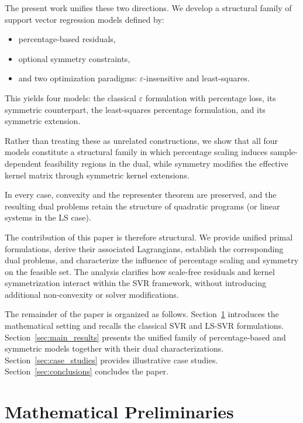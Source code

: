 \documentclass[mathematics,article,submit,pdftex,moreauthors]{Definitions/mdpi}
\begin{document}
The present work unifies these two directions.
We develop a structural family of support vector regression
models defined by:

\begin{itemize}
    \item percentage-based residuals,
    \item optional symmetry constraints,
    \item and two optimization paradigms:
    $\varepsilon$-insensitive and least-squares.
\end{itemize}

This yields four models:
the classical $\varepsilon$ formulation with percentage loss,
its symmetric counterpart,
the least-squares percentage formulation,
and its symmetric extension.

Rather than treating these as unrelated constructions,
we show that all four models constitute a structural family
in which percentage scaling induces sample-dependent
feasibility regions in the dual,
while symmetry modifies the effective kernel matrix
through symmetric kernel extensions.

In every case, convexity and the representer theorem are preserved,
and the resulting dual problems retain the structure of
quadratic programs (or linear systems in the LS case).

The contribution of this paper is therefore structural.
We provide unified primal formulations,
derive their associated Lagrangians,
establish the corresponding dual problems,
and characterize the influence of percentage scaling
and symmetry on the feasible set.
The analysis clarifies how scale-free residuals and
kernel symmetrization interact within the SVR framework,
without introducing additional non-convexity
or solver modifications.

The remainder of the paper is organized as follows.
Section~\ref{sec:preliminaries} introduces the mathematical
setting and recalls the classical SVR and LS-SVR formulations.
Section~\ref{sec:main_results} presents the unified family of
percentage-based and symmetric models together with
their dual characterizations.
Section~\ref{sec:case_studies} provides illustrative case studies.
Section~\ref{sec:conclusions} concludes the paper.

\section{Mathematical Preliminaries}\label{sec:preliminaries}
\end{document}

